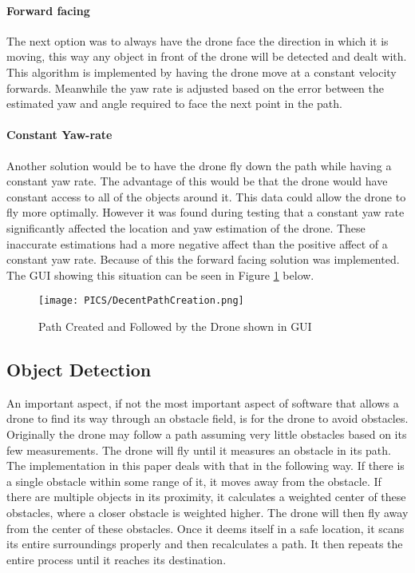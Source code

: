 \documentclass{article}
\begin{document}
\paragraph{Forward facing}
The next option was to always have the drone face the direction in which it is moving, this way any object in front of the drone will be detected and dealt with. This algorithm is implemented by having the drone move at a constant velocity forwards. Meanwhile the yaw rate is adjusted based on the error between the estimated yaw and angle required to face the next point in the path.
\paragraph{Constant Yaw-rate}
Another solution would be to have the drone fly down the path while having a constant yaw rate. The advantage of this would be that the drone would have constant access to all of the objects around it. This data could allow the drone to fly more optimally. However it was found during testing that a constant yaw rate significantly affected the location and yaw estimation of the drone. These inaccurate estimations had a more negative affect than the positive affect of a constant yaw rate. 
Because of this the forward facing solution was implemented. The GUI showing this situation can be seen in Figure \ref{fig:pathExecute} below.
\begin{figure}
\centering
\texttt{[image: PICS/DecentPathCreation.png]}
\caption{\label{fig:pathExecute}Path Created and Followed by the Drone shown in GUI}
\end{figure}


\subsection{Object Detection}
An important aspect, if not the most important aspect of software that allows a drone to find its way through an obstacle field, is for the drone to avoid obstacles. Originally the drone may follow a path assuming very little obstacles based on its few measurements. The drone will fly until it measures an obstacle in its path. The implementation in this paper deals with that in the following way. If there is a single obstacle within some range of it, it moves away from the obstacle. If there are multiple objects in its proximity, it calculates a weighted center of these obstacles, where a closer obstacle is weighted higher. The drone will then fly away from the center of these obstacles. Once it deems itself in a safe location, it scans its entire surroundings properly and then recalculates a path. It then repeats the entire process until it reaches its destination.
\end{document}
